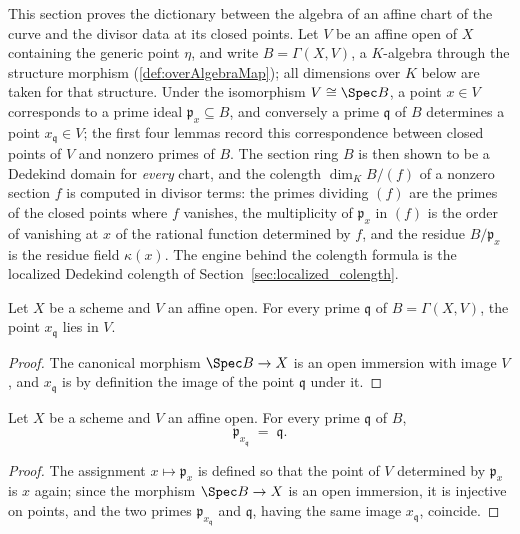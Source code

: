 This section proves the dictionary between the algebra of an affine chart of the curve and
the divisor data at its closed points. Let \(V\) be an affine open of \(X\) containing the
generic point \(\eta\), and write \(B = \Gamma(X, V)\), a \(K\)-algebra through the
structure morphism (\ref{def:overAlgebraMap}); all dimensions over \(K\) below are taken
for that structure. Under the isomorphism \(V \cong \Spec B\), a point \(x \in V\)
corresponds to a prime ideal \(\mathfrak p_x \subseteq B\), and conversely a prime
\(\mathfrak q\) of \(B\) determines a point \(x_{\mathfrak q} \in V\); the first four
lemmas record this correspondence between closed points of \(V\) and nonzero primes of
\(B\). The section ring \(B\) is then shown to be a Dedekind domain for \emph{every}
chart, and the colength \(\dim_K B/(f)\) of a nonzero section \(f\) is computed in
divisor terms: the primes dividing \((f)\) are the primes of the closed points where
\(f\) vanishes, the multiplicity of \(\mathfrak p_x\) in \((f)\) is the order of
vanishing at \(x\) of the rational function determined by \(f\), and the residue
\(B/\mathfrak p_x\) is the residue field \(\kappa(x)\). The engine behind the colength
formula is the localized Dedekind colength of
Section~\ref{sec:localized_colength}.

\begin{lemma}
  \label{lem:fromSpec_base_mem}
  \leanok
  Let \(X\) be a scheme and \(V\) an affine open. For every prime \(\mathfrak q\) of
  \(B = \Gamma(X, V)\), the point \(x_{\mathfrak q}\) lies in \(V\).
\end{lemma}
\begin{proof}
  \leanok
  The canonical morphism \(\Spec B \to X\) is an open immersion with image \(V\), and
  \(x_{\mathfrak q}\) is by definition the image of the point \(\mathfrak q\) under it.
\end{proof}

\begin{lemma}
  \label{lem:primeIdealOf_fromSpec_base}
  \leanok
  Let \(X\) be a scheme and \(V\) an affine open. For every prime \(\mathfrak q\) of
  \(B\),
  \[
    \mathfrak p_{x_{\mathfrak q}} \;=\; \mathfrak q .
  \]
\end{lemma}
\begin{proof}
  \leanok
  The assignment \(x \mapsto \mathfrak p_x\) is defined so that the point of \(V\)
  determined by \(\mathfrak p_x\) is \(x\) again; since the morphism
  \(\Spec B \to X\) is an open immersion, it is injective on points, and the two
  primes \(\mathfrak p_{x_{\mathfrak q}}\) and \(\mathfrak q\), having the same image
  \(x_{\mathfrak q}\), coincide.
\end{proof}


